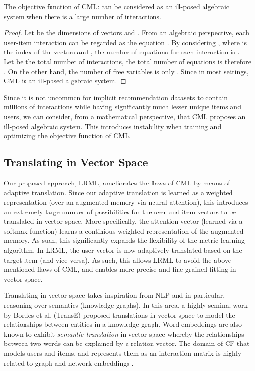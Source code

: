 \documentclass[sigconf]{acmart}
\begin{document}
\begin{theorem}
The objective function of CML:  can be considered as an ill-posed algebraic system when there is a large number of interactions. 
\end{theorem}

\begin{proof}
Let  be the dimensions of vectors  and . From an algebraic perspective, each user-item interaction can be regarded as the equation . By considering , where  is the index of the vectors  and , the number of equations for each interaction is . Let  be the total number of interactions, the total number of equations is therefore . On the other hand, the number of free variables is only . Since  in most settings, 
CML is an ill-posed algebraic system. 
\end{proof}

 Since it is not uncommon for implicit recommendation datasets to contain millions of interactions while having significantly much lesser unique items and users, we can consider, from a mathematical perspective, that CML proposes an ill-posed algebraic system. This introduces instability when training and optimizing the objective function of CML. 

\subsection{Translating in Vector Space}


Our proposed approach, \textsc{LRML}, ameliorates the flaws of CML by means of adaptive translation. Since our adaptive translation is learned as a weighted representation (over an augmented memory via neural attention), this introduces an extremely large number of possibilities for the user and item vectors to be translated in vector space. More specifically, the attention vector (learned via a softmax function) learns a continious weighted representation of the augmented memory. As such, this significantly expands the flexibility of the metric learning algorithm. In LRML, the user vector is now adaptively translated based on the target item (and vice versa). As such, this allows \textsc{LRML} to avoid the above-mentioned flaws of CML, and enables more precise and fine-grained fitting in vector space. 

Translating in vector space takes inspiration from NLP and in particular, reasoning over semantics (knowledge graphs). In this area, a highly seminal work by Bordes et al. (TransE) \cite{DBLP:conf/nips/BordesUGWY13} proposed translations in vector space to model the relationships between entities in a knowledge graph. Word embeddings \cite{DBLP:conf/nips/MikolovSCCD13} are also known to exhibit \textit{semantic translation} in vector space whereby the relationships between two words can be explained by a relation vector. The domain of CF that models users and items, and represents them as an interaction matrix is highly related to graph and network embeddings \cite{DBLP:conf/kdd/PerozziAS14,DBLP:conf/www/TangQWZYM15,Ma:2018:MNE:3159652.3159680}. 
\end{document}
